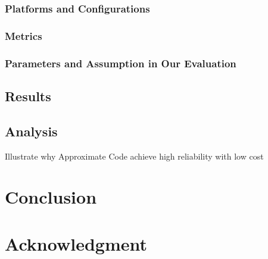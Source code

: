 \documentclass[conference]{IEEEtran}
\begin{document}
\subsubsection{Platforms and Configurations}
\subsubsection{Metrics}
\subsubsection{Parameters and Assumption in Our Evaluation}


\subsection{Results}
\subsection{Analysis}
Illustrate why Approximate Code achieve high reliability with low cost
\section{Conclusion}
\section*{Acknowledgment}



\end{document}
